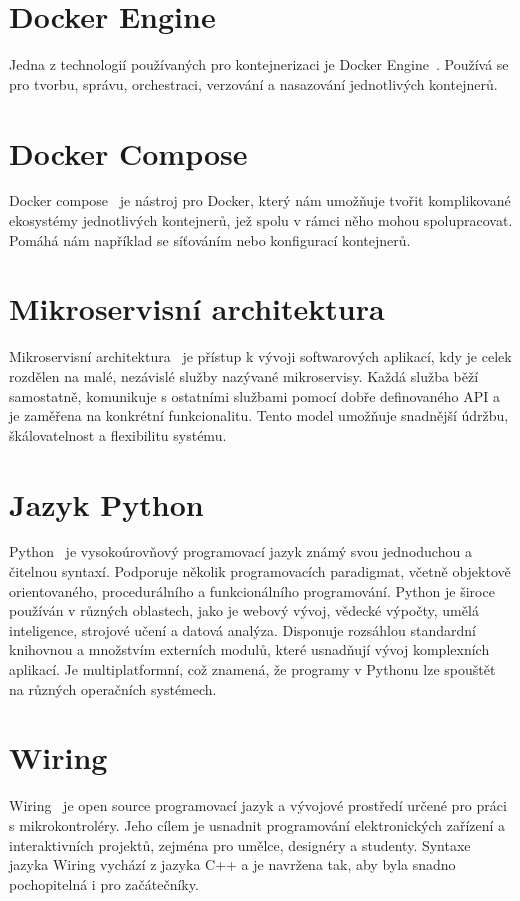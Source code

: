 \section{Docker Engine}\label{sec:docker-engine}
Jedna z technologií používaných pro kontejnerizaci je Docker Engine~\cite{kontejnerizace-docker}.
Používá se pro tvorbu, správu, orchestraci, verzování a nasazování jednotlivých kontejnerů.

\section{Docker Compose}\label{sec:docker-compose}
Docker compose~\cite{kontejnerizace-docker-compose} je nástroj pro Docker, který nám umožňuje tvořit komplikované ekosystémy jednotlivých kontejnerů, jež spolu v rámci něho mohou spolupracovat.
Pomáhá nám například se síťováním nebo konfigurací kontejnerů.

\section{Mikroservisní architektura}\label{sec:microservice-architecture}
Mikroservisní architektura~\cite{mikroservisy} je přístup k vývoji softwarových aplikací, kdy je celek rozdělen na malé, nezávislé služby nazývané mikroservisy.
Každá služba běží samostatně, komunikuje s ostatními službami pomocí dobře definovaného API a je zaměřena na konkrétní funkcionalitu.
Tento model umožňuje snadnější údržbu, škálovatelnost a flexibilitu systému.

\section{Jazyk Python}\label{sec:python}
Python~\cite{python} je vysokoúrovňový programovací jazyk známý svou jednoduchou a čitelnou syntaxí.
Podporuje několik programovacích paradigmat, včetně objektově orientovaného, procedurálního a funkcionálního programování.
Python je široce používán v různých oblastech, jako je webový vývoj, vědecké výpočty, umělá inteligence, strojové učení a datová analýza.
Disponuje rozsáhlou standardní knihovnou a množstvím externích modulů, které usnadňují vývoj komplexních aplikací.
Je multiplatformní, což znamená, že programy v Pythonu lze spouštět na různých operačních systémech.

\section{Wiring}\label{sec:wiring}
Wiring~\cite{wire} je open source programovací jazyk a vývojové prostředí určené pro práci s mikrokontroléry.
Jeho cílem je usnadnit programování elektronických zařízení a interaktivních projektů, zejména pro umělce, designéry a studenty.
Syntaxe jazyka Wiring vychází z jazyka C++ a je navržena tak, aby byla snadno pochopitelná i pro začátečníky.

